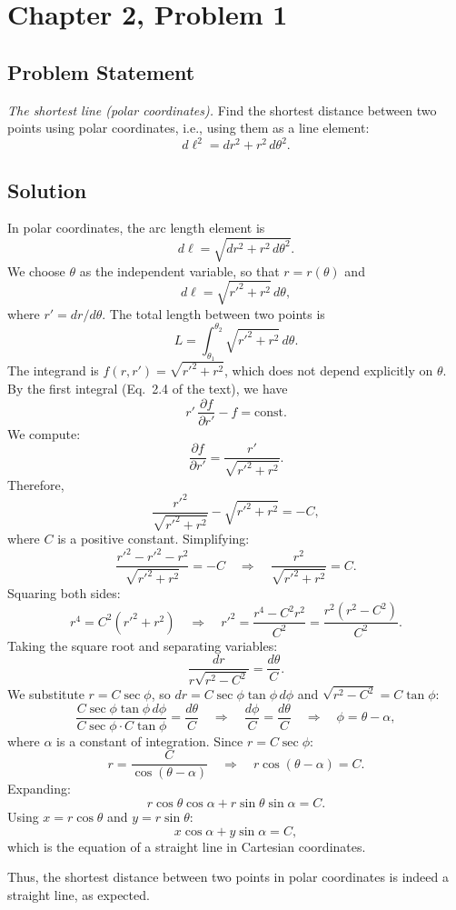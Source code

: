 \documentclass[12pt]{article}
\begin{document}
\section*{Chapter 2, Problem 1}

\subsection*{Problem Statement}
\textit{The shortest line (polar coordinates).} Find the shortest distance between two points using polar coordinates, i.e., using them as a line element:
\[
  d\ell^2 = dr^2 + r^2\,d\theta^2.
\]

\subsection*{Solution}

In polar coordinates, the arc length element is
\[
  d\ell = \sqrt{dr^2 + r^2\,d\theta^2}.
\]
We choose $\theta$ as the independent variable, so that $r = r(\theta)$ and
\[
  d\ell = \sqrt{r'^2 + r^2}\,d\theta,
\]
where $r' = dr/d\theta$. The total length between two points is
\[
  L = \int_{\theta_1}^{\theta_2} \sqrt{r'^2 + r^2}\,d\theta.
\]
The integrand is $f(r, r') = \sqrt{r'^2 + r^2}$, which does not depend explicitly on $\theta$. By the first integral (Eq.~2.4 of the text), we have
\[
  r'\,\frac{\partial f}{\partial r'} - f = \text{const}.
\]
We compute:
\[
  \frac{\partial f}{\partial r'} = \frac{r'}{\sqrt{r'^2 + r^2}}.
\]
Therefore,
\[
  \frac{r'^2}{\sqrt{r'^2 + r^2}} - \sqrt{r'^2 + r^2} = -C,
\]
where $C$ is a positive constant. Simplifying:
\[
  \frac{r'^2 - r'^2 - r^2}{\sqrt{r'^2 + r^2}} = -C
  \quad \Longrightarrow \quad
  \frac{r^2}{\sqrt{r'^2 + r^2}} = C.
\]
Squaring both sides:
\[
  r^4 = C^2(r'^2 + r^2)
  \quad \Longrightarrow \quad
  r'^2 = \frac{r^4 - C^2 r^2}{C^2} = \frac{r^2(r^2 - C^2)}{C^2}.
\]
Taking the square root and separating variables:
\[
  \frac{dr}{r\sqrt{r^2 - C^2}} = \frac{d\theta}{C}.
\]
We substitute $r = C\sec\phi$, so $dr = C\sec\phi\tan\phi\,d\phi$ and $\sqrt{r^2-C^2} = C\tan\phi$:
\[
  \frac{C\sec\phi\tan\phi\,d\phi}{C\sec\phi \cdot C\tan\phi} = \frac{d\theta}{C}
  \quad \Longrightarrow \quad
  \frac{d\phi}{C} = \frac{d\theta}{C}
  \quad \Longrightarrow \quad
  \phi = \theta - \alpha,
\]
where $\alpha$ is a constant of integration. Since $r = C\sec\phi$:
\[
  r = \frac{C}{\cos(\theta - \alpha)}
  \quad \Longrightarrow \quad
  r\cos(\theta - \alpha) = C.
\]
Expanding:
\[
  r\cos\theta\cos\alpha + r\sin\theta\sin\alpha = C.
\]
Using $x = r\cos\theta$ and $y = r\sin\theta$:
\[
  x\cos\alpha + y\sin\alpha = C,
\]
which is the equation of a straight line in Cartesian coordinates.

Thus, the shortest distance between two points in polar coordinates is indeed a straight line, as expected.
\end{document}
